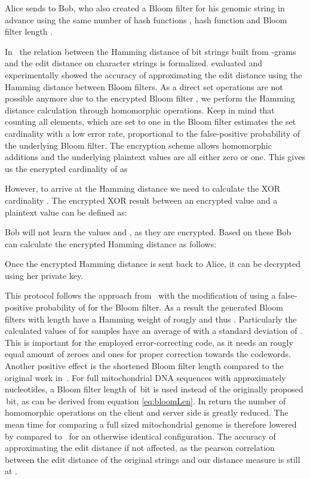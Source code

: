 \documentclass{llncs}
\begin{document}
Alice sends  to Bob, who also created a Bloom filter  for his genomic string in advance using the same number of hash functions , hash function  and Bloom filter length . 


In~\cite{Li07} the relation between the Hamming distance of bit strings built from -grams and the edit distance on character strings is formalized.
\cite{BecKer12} evaluated and experimentally showed the accuracy of approximating the edit distance using the Hamming distance between Bloom filters.
As a direct set operations are not possible anymore due to the encrypted Bloom filter , we perform the Hamming distance calculation through homomorphic operations.
Keep in mind that counting all elements, which are set to one in the Bloom filter estimates the set cardinality with a low error rate, proportional to the false-positive probability of the underlying Bloom filter.
The encryption scheme allows homomorphic additions and the underlying plaintext values are all either zero or one.
This gives us the encrypted cardinality  of  as


However, to arrive at the Hamming distance  we need to calculate the XOR cardinality .
The encrypted XOR result between an encrypted value  and a plaintext value  can be defined as:




Bob will not learn the values  and , as they are encrypted.
Based on these Bob can calculate the encrypted Hamming distance  as follows:

Once the encrypted Hamming distance is sent back to Alice, it can be decrypted using her private key.

This protocol follows the approach from~\cite{BecKer12} with the modification of using a false-positive probability of  for the Bloom filter.
As a result the generated Bloom filters  with length  have a Hamming weight of rougly  and thus .
Particularly the calculated values of  for  samples have an average of  with a standard deviation of .
This is important for the employed error-correcting code, as it needs an rougly equal amount of zeroes and ones for proper correction towards the codewords.
Another positive effect is the shortened Bloom filter length  compared to the original work in~\cite{BecKer12}.
For full mitochondrial DNA sequences with approximately  nucleotides, a Bloom filter length of \,bit is used instead of the originally proposed \,bit, as can be derived from equation \eqref{eq:bloomLen}.
In return the number of homomorphic operations on the client and server side is greatly reduced.
The mean time for comparing a full sized mitochondrial genome is therefore lowered by  compared to~\cite{BecKer12} for an otherwise identical configuration.
The accuracy of approximating the edit distance if not affected, as the pearson correlation between the edit distance of the original strings and our distance measure is still at .
\end{document}
